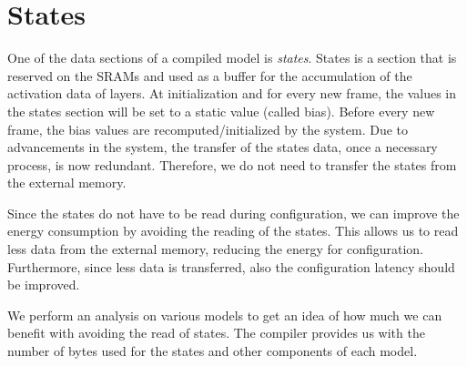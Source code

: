 \section{States}
One of the data sections of a compiled model is \textit{states}.
States is a section that is reserved on the SRAMs and used as a buffer for the accumulation of the activation data of layers.
At initialization and for every new frame, the values in the states section will be set to a static value (called bias).
Before every new frame, the bias values are recomputed/initialized by the system.
Due to advancements in the system, the transfer of the states data, once a necessary process, is now redundant.
Therefore, we do not need to transfer the states from the external memory.


Since the states do not have to be read during configuration, we can improve the energy consumption by avoiding the reading of the states.
This allows us to read less data from the external memory, reducing the energy for configuration.
Furthermore, since less data is transferred, also the configuration latency should be improved.

We perform an analysis on various models to get an idea of how much we can benefit with avoiding the read of states.
The compiler provides us with the number of bytes used for the states and other components of each model.

